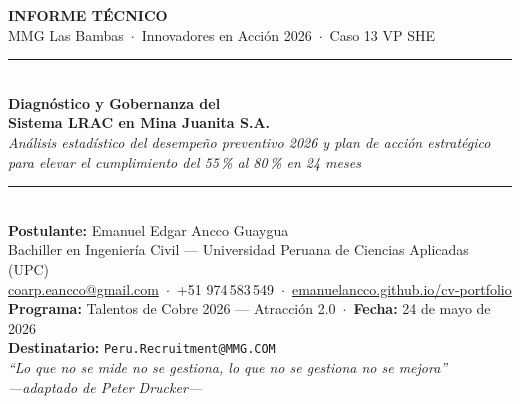 \documentclass[12pt,a4paper]{article}
\begin{document}
\thispagestyle{empty}
\begin{center}
\vspace*{1cm}
{\large\bfseries\color{mmgred} INFORME TÉCNICO}\\[0.3cm]
{\normalsize MMG Las Bambas \,$\cdot$\, Innovadores en Acción 2026 \,$\cdot$\, Caso 13 VP SHE}\\[1.2cm]

\rule{14cm}{0.6pt}\\[0.3cm]
{\LARGE\bfseries Diagnóstico y Gobernanza del}\\[0.2cm]
{\LARGE\bfseries Sistema LRAC en Mina Juanita S.A.}\\[0.25cm]
{\itshape Análisis estadístico del desempeño preventivo 2026 y plan de acción estratégico}\\[0.1cm]
{\itshape para elevar el cumplimiento del 55\,\% al 80\,\% en 24 meses}\\[0.3cm]
\rule{14cm}{0.6pt}\\[1.6cm]

\textbf{Postulante:} {\large Emanuel Edgar Ancco Guaygua}\\[0.15cm]
Bachiller en Ingeniería Civil --- Universidad Peruana de Ciencias Aplicadas (UPC)\\[0.1cm]
\href{mailto:coarp.eancco@gmail.com}{coarp.eancco@gmail.com} \,$\cdot$\, +51 974\,583\,549 \,$\cdot$\,
\href{https://emanuelancco.github.io/cv-portfolio/}{emanuelancco.github.io/cv-portfolio}\\[1.4cm]

\textbf{Programa:} Talentos de Cobre 2026 --- Atracción 2.0 \,$\cdot$\,
\textbf{Fecha:} 24 de mayo de 2026\\
\textbf{Destinatario:} \texttt{Peru.Recruitment@MMG.COM}\\[0.8cm]

\textit{\small ``Lo que no se mide no se gestiona, lo que no se gestiona no se mejora''}\\
\textit{\small ---adaptado de Peter Drucker---}
\end{center}
\vfill


\end{document}
